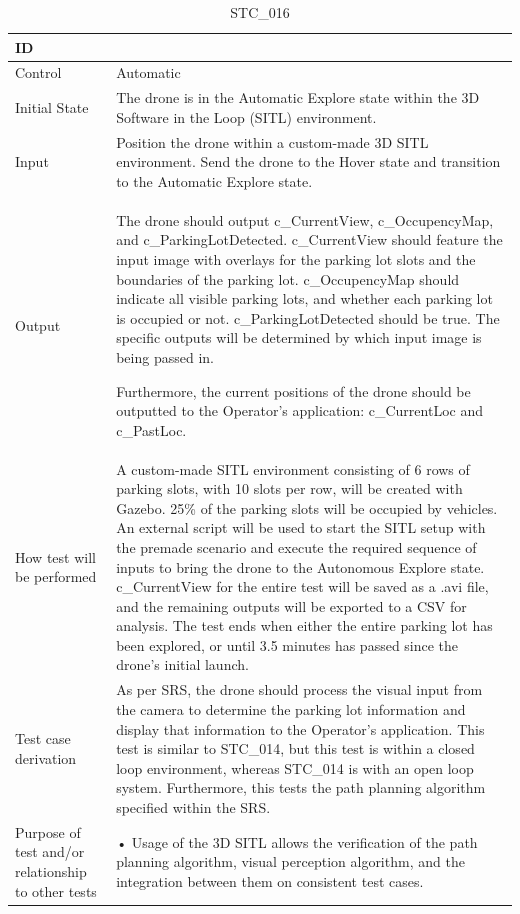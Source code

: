 \documentclass[12pt, titlepage]{article}
\begin{document}
\begin{table}[!h]
\begin{center}
\caption {STC\_016}
\label{tab:STC_016}
\begin{tabular}{ | m{3.2cm} | m{12.2cm} | } 
\hline
ID & \nameref{tab:STC_016} \\ 
\hline
Control & Automatic \\ 
\hline
Initial State & The drone is in the Automatic Explore state within the 3D Software in the Loop (SITL) environment. \\ 
\hline
Input & Position the drone within a custom-made 3D SITL environment. Send the drone to the Hover state and transition to the Automatic Explore state. \\ 
\hline
Output & The drone should output c\_CurrentView, c\_OccupencyMap, and c\_ParkingLotDetected. c\_CurrentView should feature the input image with overlays for the parking lot slots and the boundaries of the parking lot. c\_OccupencyMap should indicate all visible parking lots, and whether each parking lot is occupied or not. c\_ParkingLotDetected should be true. The specific outputs will be determined by which input image is being passed in.

Furthermore, the current positions of the drone should be outputted to the Operator's application: c\_CurrentLoc and c\_PastLoc. \\ 
\hline
How test will be performed & A custom-made SITL environment consisting of 6 rows of parking slots, with 10 slots per row, will be created with Gazebo. 25\% of the parking slots will be occupied by vehicles. An external script will be used to start the SITL setup with the premade scenario and execute the required sequence of inputs to bring the drone to the Autonomous Explore state. c\_CurrentView for the entire test will be saved as a .avi file, and the remaining outputs will be exported to a CSV for analysis. The test ends when either the entire parking lot has been explored, or until 3.5 minutes has passed since the drone's initial launch.
 \\ 
\hline
Test case derivation & As per SRS, the drone should process the visual input from the camera to determine the parking lot information and display that information to the Operator's application. This test is similar to STC_014, but this test is within a closed loop environment, whereas STC_014 is with an open loop system. Furthermore, this tests the path planning algorithm specified within the SRS.
 \\ 
\hline
Purpose of test and/or relationship to other tests &  • Usage of the 3D SITL allows the verification of the path planning algorithm, visual perception algorithm, and the integration between them on consistent test cases.


\end{tabular}
\end{center}
\end{table}
\end{document}
